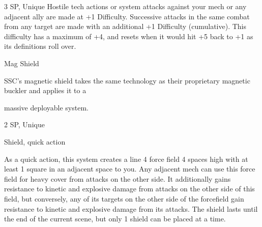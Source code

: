 3 SP, Unique  
Hostile tech actions or system attacks against your mech or any adjacent ally are made at +1  
Difficulty. Successive attacks in the same combat from any target are made with an additional +1  
Difficulty (cumulative). This difficulty has a maximum of +4, and resets when it would hit +5 back  
to +1 as its definitions roll over.
 

Mag Shield  

SSC’s magnetic shield takes the same technology as their proprietary magnetic buckler and applies it to a  

massive deployable system.  

2 SP, Unique  

Shield, quick action
 
As a quick action, this system creates a line 4 force field 4 spaces high with at least 1 square in  
an adjacent space to you. Any adjacent mech can use this force field for heavy cover from  
attacks on the other side. It additionally gains resistance to kinetic and explosive damage from  
attacks on the other side of this field, but conversely, any of its targets on the other side of the  
forcefield gain resistance to kinetic and explosive damage from its attacks. The shield lasts until  
the end of the current scene, but only 1 shield can be placed at a time.
 
